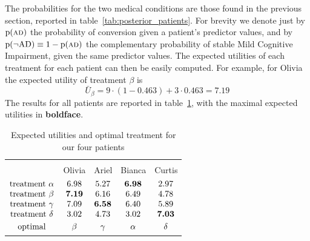\documentclass[utf8]{FrontiersinHarvard} %
\newcommand*{\p}{\mathrm{p}}%
\renewcommand*{\|}[1][]{\nonscript\:#1\vert\nonscript\:\mathopen{}}
\newcommand*{\eU}{\bar{U}}
\newcommand*{\mci}{Mild Cognitive Impairment}
\newcommand*{\AD}{\textsc{ad}}
\newcommand*{\nAD}{\lnot\mathrm{AD}}
\begin{document}
The probabilities for the two medical conditions are those found in the previous section, reported in table~\ref{tab:posterior_patients}. For brevity we denote just by $\p(\AD)$ the probability of conversion given a patient's predictor values, and by $\p(\nAD)\equiv 1- \p(\AD)$ the complementary probability of stable \mci, given the same predictor values. The expected utilities of each treatment for each patient can then be easily computed. For example, for Olivia the expected utility of treatment $\beta$ is
\begin{equation}
  \label{eq:utility_olivia_example}
  \eU_{\beta} = 9 \cdot (1-0.463) + 3 \cdot 0.463 = 7.19
\end{equation}
The results for all patients are reported in table~\ref{tab:exp_utilities_patients}, with the maximal expected utilities in \textbf{boldface}.

\medskip
\begin{table}[!h]
  \centering
  \begin{tabular}{lcccc}
    \hline\\[-1.5\jot]
    &{\small Olivia} &{\small Ariel} &{\small Bianca} &{\small Curtis}
    \\[\jot]
    $\begin{matrix}
      \text{treatment }\alpha\\ 
      \text{treatment }\beta\\ 
      \text{treatment }\gamma\\ 
      \text{treatment }\delta\\[\jot]
      \text{optimal}
    \end{matrix}$
    &
    $\begin{matrix}6.98\\\bm{7.19}\\7.09\\3.02\\[\jot]\beta\end{matrix}$
    &
    $\begin{matrix}5.27\\6.16\\\bm{6.58}\\4.73\\[\jot]\gamma\end{matrix}$
    &
    $\begin{matrix}\bm{6.98}\\6.49\\6.40\\3.02\\[\jot]\alpha\end{matrix}$
    &
    $\begin{matrix}2.97\\4.78\\5.89\\\bm{7.03}\\[\jot]\delta\end{matrix}$
    \\[5\jot]
    \hline
  \end{tabular}
  \caption{Expected utilities and optimal treatment for our four patients}\label{tab:exp_utilities_patients}
\end{table}
\end{document}
